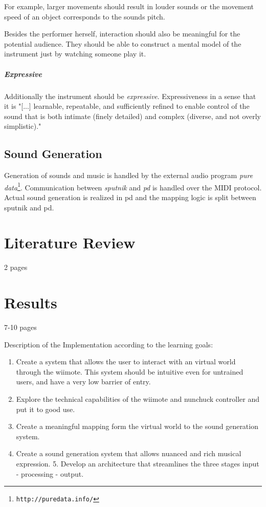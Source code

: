 \documentclass[10pt,a4paper]{scrartcl}
\begin{document}
For example, larger movements should result in louder sounds or the movement speed of an object corresponds to the sounds pitch.

Besides the performer herself, interaction should also be meaningful for the potential audience. They should be able to construct a mental model of the instrument just by watching someone play it.

\subparagraph{Expressive}
Additionally the instrument should be \emph{expressive}. Expressiveness in a sense that it is "[...] learnable, repeatable, and sufficiently refined to enable control of the sound that is both intimate (finely detailed) and complex (diverse, and not overly simplistic)." \cite{Dobrian2006}

\subsection{Sound Generation}
Generation of sounds and music is handled by the external audio program \emph{pure data}\footnote{\texttt{http://puredata.info/}}. Communication between \emph{sputnik} and \emph{pd} is handled over the MIDI protocol. Actual sound generation is realized in pd and the mapping logic is split between sputnik and pd.



\section{Literature Review}
2 pages

\section{Results}
7-10 pages

Description of the Implementation according to the learning goals:

\begin{enumerate}
\item Create a system that allows the user to interact with an virtual world through the wiimote. This system should be intuitive even for untrained users, and have a very low barrier of entry.

\item Explore the technical capabilities of the wiimote and nunchuck controller and put it to good use.

\item Create a meaningful mapping form the virtual world to the sound generation system.

\item Create a sound generation system that allows nuanced and rich musical expression. 5. Develop an architecture that streamlines the three stages input - processing - output.
\end{enumerate}
\end{document}
